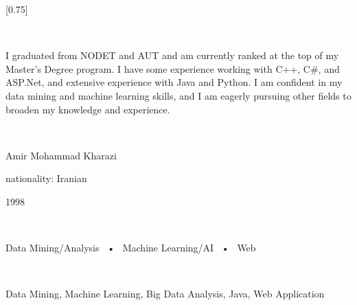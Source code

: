 \documentclass[lighthipster]{simplehipstercv}
\begin{document}
\setlength{\columnsep}{1.5cm}
[0.75]
\begin{paracol}{2}

\paracolbackgroundoptions



\footnotesize
{\setasidefontcolour
\centering
\begin{center}
\end{center}

\\[0.5em]

{\footnotesize
	\justifying
	\begin{spacing}{1.5}
		I graduated from NODET and AUT and am currently ranked at the top of my Master's Degree program. I have some experience working with C++, C\#, and ASP.Net, and extensive experience with Java and Python. I am confident in my data mining and machine learning skills, and I am eagerly pursuing other fields to broaden my knowledge and experience.
	\end{spacing}
		
	

}
\bigskip

 \\[0.5em]
\begin{spacing}{1.5}
	\justifying
Amir Mohammad Kharazi

nationality: Iranian 

1998
\end{spacing}


\bigskip

 \\[0.5em]

\begin{spacing}{1.5}
Data Mining/Analysis ~•~ Machine Learning/AI ~•~ Web
\end{spacing}



\bigskip

\\[0.5em]

\begin{spacing}{1.5}
Data Mining, Machine Learning, Big Data Analysis, Java, Web Application
\end{spacing}

}
\end{paracol}
\end{document}
